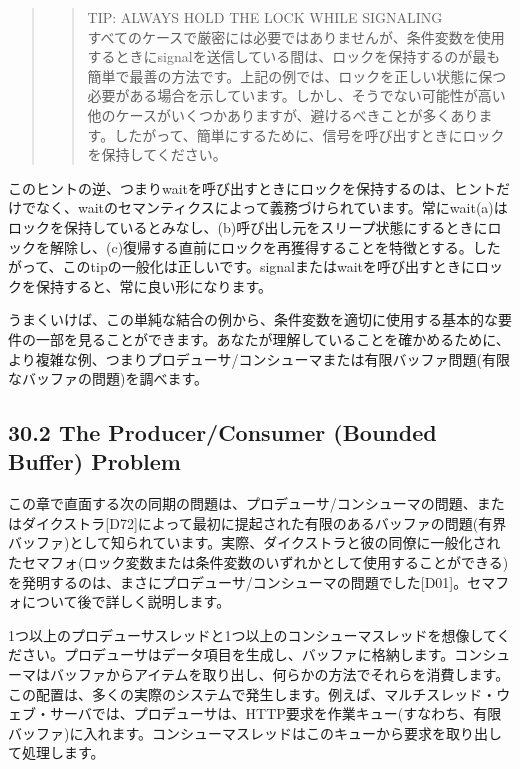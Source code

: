 \begin{quote}
\begin{quote}
TIP: ALWAYS HOLD THE LOCK WHILE SIGNALING\\
すべてのケースで厳密には必要ではありませんが、条件変数を使用するときにsignalを送信している間は、ロックを保持するのが最も簡単で最善の方法です。上記の例では、ロックを正しい状態に保つ必要がある場合を示しています。しかし、そうでない可能性が高い他のケースがいくつかありますが、避けるべきことが多くあります。したがって、簡単にするために、信号を呼び出すときにロックを保持してください。
\end{quote}
\end{quote}

このヒントの逆、つまりwaitを呼び出すときにロックを保持するのは、ヒントだけでなく、waitのセマンティクスによって義務づけられています。常にwait(a)はロックを保持しているとみなし、(b)呼び出し元をスリープ状態にするときにロックを解除し、(c)復帰する直前にロックを再獲得することを特徴とする。したがって、このtipの一般化は正しいです。signalまたはwaitを呼び出すときにロックを保持すると、常に良い形になります。

うまくいけば、この単純な結合の例から、条件変数を適切に使用する基本的な要件の一部を見ることができます。あなたが理解していることを確かめるために、より複雑な例、つまりプロデューサ/コンシューマまたは有限バッファ問題(有限なバッファの問題)を調べます。

\hypertarget{the-producerconsumer-bounded-buffer-problem}{%
\subsection*{30.2 The Producer/Consumer (Bounded Buffer)
Problem}\label{the-producerconsumer-bounded-buffer-problem}}

この章で直面する次の同期の問題は、プロデューサ/コンシューマの問題、またはダイクストラ{[}D72{]}によって最初に提起された有限のあるバッファの問題(有界バッファ)として知られています。実際、ダイクストラと彼の同僚に一般化されたセマフォ(ロック変数または条件変数のいずれかとして使用することができる)を発明するのは、まさにプロデューサ/コンシューマの問題でした{[}D01{]}。セマフォについて後で詳しく説明します。

1つ以上のプロデューサスレッドと1つ以上のコンシューマスレッドを想像してください。プロデューサはデータ項目を生成し、バッファに格納します。コンシューマはバッファからアイテムを取り出し、何らかの方法でそれらを消費します。この配置は、多くの実際のシステムで発生します。例えば、マルチスレッド・ウェブ・サーバでは、プロデューサは、HTTP要求を作業キュー(すなわち、有限バッファ)に入れます。コンシューマスレッドはこのキューから要求を取り出して処理します。

